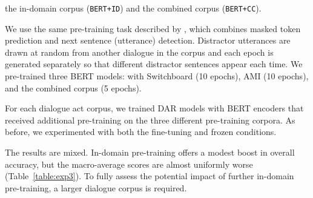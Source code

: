 \documentclass[11pt,a4paper]{article}
\begin{document}
the in-domain corpus (\texttt{BERT+ID}) and the combined corpus (\texttt{BERT+CC}).

We use the same pre-training task described by \citet{devlinBERTPretrainingDeep2018}, which combines masked token prediction and next sentence (utterance) detection. 
Distractor utterances are drawn at random from another dialogue in the corpus
and each epoch is generated separately so that different distractor sentences appear each time.
We pre-trained three BERT models: with Switchboard (10 epochs), AMI (10 epochs), and the combined corpus (5 epochs).

For each dialogue act corpus, we trained DAR models with BERT encoders that received additional pre-training on the three different pre-training corpora. 
As before, we experimented with both the fine-tuning and frozen conditions.

The results are mixed.
In-domain pre-training offers a modest boost in overall accuracy,
but the macro-average scores are almost uniformly worse (Table~\ref{table:exp3}).
To fully assess the potential impact of further in-domain pre-training, a larger dialogue corpus is required.
\end{document}
